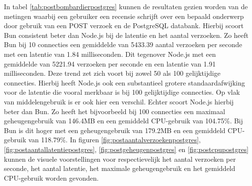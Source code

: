 In tabel \ref{tab:postbombardierpostgres} kunnen de resultaten gezien worden van de metingen waarbij 
een gebruiker een recensie schrijft over een bepaald onderwerp door gebruik van een POST verzoek en de PostgreSQL databank.
Hierbij scoort Bun consistent beter dan Node.js bij de latentie en het aantal verzoeken.
Zo heeft Bun bij 10 connecties een gemiddelde van 5433.39 aantal verzoeken per seconde met een latentie van 1.84 milliseconden. 
Dit tegenover Node.js met een gemiddelde van 5221.94 verzoeken per seconde en een latentie van 1.91 milliseconden.
Deze trend zet zich voort bij zowel 50 als 100 gelijktijdige connecties.
Hierbij heeft Node.js ook een substantieel grotere standaardafwijking voor de latentie die vooral merkbaar is bij 100 gelijktijdige connecties.
Op vlak van middelengebruik is er ook hier een verschil. Echter scoort Node.js hierbij beter dan Bun.
Zo heeft het bijvoorbeeld bij 100 connecties een maximaal geheugengebruik van 146.4MB en een gemiddeld CPU-gebruik van 104.75\%.
Bij Bun is dit hoger met een geheugengebruik van 179.2MB en een gemiddeld CPU-gebruik van 118.79\%.
In figuren \ref{fig:postaantalverzoekenpostgres}, \ref{fig:postaantallatentiepostgres}, \ref{fig:postgeheugenpostgres} en \ref{fig:postcpupostgres} kunnen de visuele voorstellingen 
voor respectievelijk het aantal verzoeken per seconde, het aantal latentie, het maximale geheugengebruik en het gemiddeld CPU-gebruik worden gevonden.

